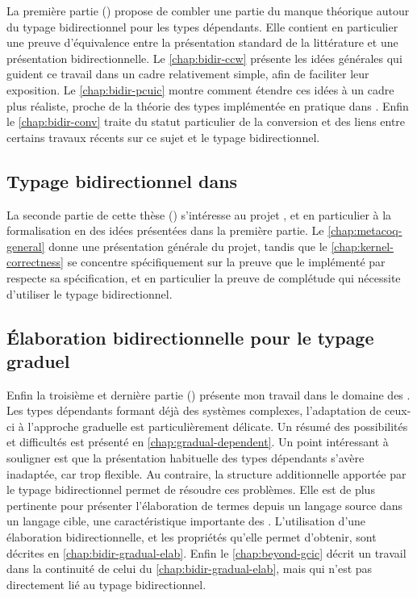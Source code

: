 La première partie () propose de combler une partie du
manque théorique autour du typage bidirectionnel pour les types dépendants.
Elle contient en particulier une
preuve d’équivalence entre la présentation standard de la littérature
et une présentation bidirectionnelle.
Le \cref{chap:bidir-ccw} présente les idées générales qui guident ce travail
dans un cadre relativement simple, afin de faciliter leur exposition. 
Le \cref{chap:bidir-pcuic} montre comment étendre ces idées à un
cadre plus réaliste, proche de la théorie des types implémentée en pratique dans .
Enfin le \cref{chap:bidir-conv} traite du statut particulier de la
conversion
et des liens entre certains travaux récents sur ce sujet et le typage bidirectionnel.

\subsection{Typage bidirectionnel dans }

La seconde partie de cette thèse ()
s’intéresse au projet ,
et en particulier à la formalisation en  des idées présentées dans la
première partie. Le \cref{chap:metacoq-general} donne une présentation générale du
projet, tandis que le \cref{chap:kernel-correctness} se concentre spécifiquement
sur la preuve que le  implémenté par  respecte sa spécification,
et en particulier la preuve de complétude qui nécessite d’utiliser le typage bidirectionnel.

\subsection{Élaboration bidirectionnelle pour le typage graduel}

Enfin la troisième et dernière partie ()
présente mon travail dans le domaine des .
Les types dépendants formant déjà des systèmes
complexes, l’adaptation de ceux-ci à l’approche graduelle est particulièrement
délicate. Un résumé des possibilités et difficultés est présenté
en \cref{chap:gradual-dependent}.
Un point intéressant à souligner est que la présentation habituelle
des types dépendants s’avère inadaptée, car trop flexible.
Au contraire, la structure additionnelle apportée par le typage bidirectionnel permet de résoudre
ces problèmes.
Elle est de plus pertinente pour présenter
l’élaboration de termes depuis un langage source dans un langage cible, une
caractéristique importante des .
L’utilisation d’une élaboration bidirectionnelle, et les propriétés qu’elle
permet d’obtenir, sont décrites en \cref{chap:bidir-gradual-elab}.
Enfin le \cref{chap:beyond-gcic} décrit un travail dans la continuité de celui du
\cref{chap:bidir-gradual-elab}, mais qui n’est pas directement lié au typage bidirectionnel.

